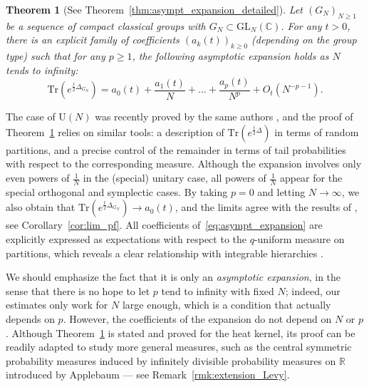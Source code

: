 \documentclass[11pt,a4paper,reqno]{article}
\newtheorem{theorem}{Theorem}[section]
\theoremstyle{definition}
\theoremstyle{remark}
\newcommand\GL{{\mathrm{GL}}}
\newcommand\U{{\mathrm U}}
\newcommand\R{\mathbb{R}}
\newcommand\C{\mathbb{C}}
\newcommand\Tr{\mathrm{Tr}}
\begin{document}
\begin{theorem}[See Theorem~\ref{thm:asympt_expansion_detailed}]\label{thm:asympt_expansion}
Let $(G_N)_{N\geq 1}$ be a sequence of compact classical groups with $G_N\subset\GL_N(\C)$. For any $t>0$, there is an explicit family of coefficients $(a_k(t))_{k\geq 0}$ (depending on the group type) such that for any $p\geq 1$, the following asymptotic expansion holds as $N$ tends to infinity:
\begin{equation}\label{eq:asympt_expansion}
\Tr(e^{\frac{t}{2}\Delta_{G_N}})=a_0(t)+\frac{a_1(t)}{N}+\ldots+\frac{a_p(t)}{N^p}+O_t\left(N^{-p-1}\right).
\end{equation}
\end{theorem}
The case of $\U(N)$ was recently proved by the same authors \cite[Theorem 1.2]{LM2}, and the proof of Theorem~\ref{thm:asympt_expansion} relies on similar tools: a description of $\Tr(e^{\frac{t}{2}\Delta})$ in terms of random partitions, and a precise control of the remainder in terms of tail probabilities with respect to the corresponding measure. Although the expansion involves only even powers of $\frac1N$ in the (special) unitary case, all powers of $\frac1N$ appear for the special orthogonal and symplectic cases. By taking $p=0$ and letting $N\to\infty$, we also obtain that $\Tr(e^{\frac{t}{2}\Delta_{G_N}})\to a_0(t)$, and the limits agree with the results of \cite{Lem,DL}, see Corollary~\ref{cor:lim_pf}. All coefficients of~\eqref{eq:asympt_expansion} are explicitly expressed as expectations with respect to the $q$-uniform measure on partitions, which reveals a clear relationship with integrable hierarchies \cite{BO,OP2}.

We should emphasize the fact that it is only an \emph{asymptotic expansion}, in the sense that there is no hope to let $p$ tend to infinity with fixed $N$; indeed, our estimates only work for $N$ large enough, which is a condition that actually depends on $p$. However, the coefficients of the expansion do not depend on $N$ or $p$. Although Theorem~\ref{thm:asympt_expansion} is stated and proved for the heat kernel, its proof can be readily adapted to study more general measures, such as the central symmetric probability measures induced by infinitely divisible probability measures on $\R$ introduced by Applebaum \cite{App} --- see Remark~\ref{rmk:extension_Levy}.
\end{document}
